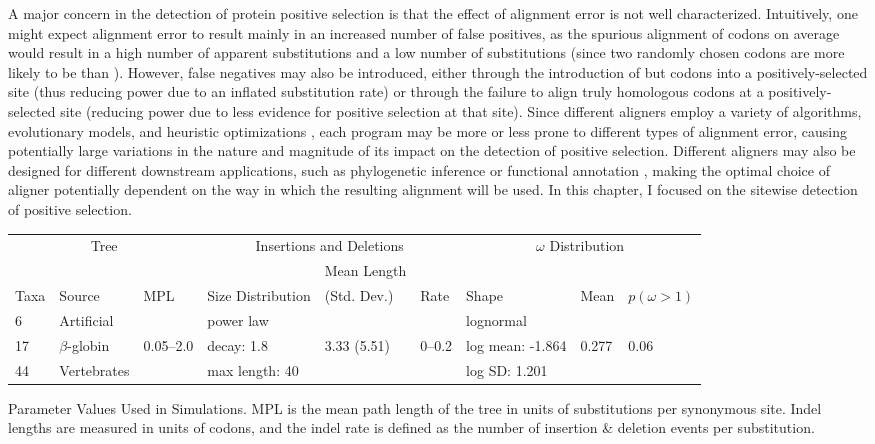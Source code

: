 A major concern in the detection of protein positive selection is that
the effect of alignment error is not well characterized. Intuitively,
one might expect alignment error to result mainly in an increased
number of false positives, as the spurious alignment of \nh codons on
average would result in a high number of apparent \nsyn substitutions
and a low number of \syn substitutions (since two randomly chosen
codons are more likely to be \nsyn than \syn).  However, false
  negatives may also be introduced, either through the introduction of
  \syn but \nh codons into a positively-selected site (thus reducing
  power due to an inflated \syn substitution rate) or through the
  failure to align truly homologous codons at a positively-selected
  site (reducing power due to less evidence for positive selection at
  that site).  Since different aligners employ a variety of
algorithms, evolutionary models, and heuristic optimizations
\citep{Notredame2007Recent}, each program may be more or less prone to
different types of alignment error, causing potentially large
variations in the nature and magnitude of its impact on the detection
of positive selection. Different aligners may also be designed
  for different downstream applications, such as phylogenetic
  inference or functional annotation \citep{Morrison2009}, making the
  optimal choice of aligner potentially dependent on the way in which
  the resulting alignment will be used. In this chapter, I focused on
  the sitewise detection of positive selection.

\bbtable
\centering
\begin{tabular}{lllllllll}
\toprule
 \multicolumn{3}{c}{Tree} & \multicolumn{3}{c}{Insertions and Deletions} & \multicolumn{3}{c}{$\omega$ Distribution} \\
\cmidrule(r){1-3} \cmidrule(r){4-6} \cmidrule(r){7-9}
 & & &  & Mean Length & & & & \\
Taxa & Source & MPL & Size Distribution & (Std. Dev.) & Rate & Shape & Mean & $p (\omega>1)$ \\
\midrule
6 & Artificial & & power law & & & lognormal & & \\
17 & $\beta$-globin & 0.05--2.0 & decay: 1.8 & 3.33 (5.51) & 0--0.2 & log mean: -1.864 & 0.277 & 0.06 \\
44 & Vertebrates & & max length: 40 & & &  log SD: 1.201 & & \\
\bottomrule
\end{tabular}
\caption{Parameter Values Used in Simulations. MPL is the mean path length of the tree in units of substitutions per synonymous site. Indel lengths are measured in units of codons, and the indel rate is defined as the number of insertion \& deletion events per substitution.}
\label{table_indels_1}
\eetable

